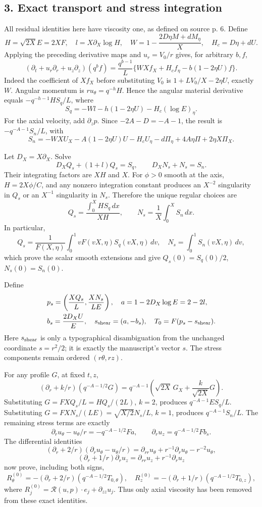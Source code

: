 \documentclass[10pt,a4paper]{article}
\begin{document}
\subsection{3. Exact transport and stress integration}

All residual identities here have viscosity one, as defined on source p. 6. Define
\[
H=\sqrt{2X}E=2XF,\quad l=X\partial_X\log H,
\quad W=1-\frac{2D\eta M+dM_\eta}{X},\quad H_c=D\eta+dU.
\]
Applying the preceding derivative maps and \(u_r=V_0/r\) gives, for arbitrary \(b,f\),
\[
(\partial_t+u_r\partial_r+u_z\partial_z)(q^bf)
=\frac{q^{b-1}}L\{W Xf_X+H_cf_\eta-b(1-2\eta U)f\}.
\]
Indeed the coefficient of \(Xf_X\) before substituting \(V_0\) is \(1+LV_0/X-2\eta U\), exactly \(W\). Angular momentum is \(ru_\theta=q^{-h}H\). Hence the angular material derivative equals \(-q^{-h-1}HS_q/L\), where
\[
S_q=-Wl-h(1-2\eta U)-H_c(\log E)_\eta.
\]
For the axial velocity, add \(\partial_zp\). Since \(-2A-D=-A-1\), the result is \(-q^{-A-1}S_n/L\), with
\[
S_n=-WXU_X-A(1-2\eta U)U-H_cU_\eta
-d\Pi_\eta+4A\eta\Pi+2\eta X\Pi_X.
\]

Let \(D_X=X\partial_X\). Solve
\[
D_XQ_s+(1+l)Q_s=S_q,\qquad D_XN_s+N_s=S_n.
\]
Their integrating factors are \(XH\) and \(X\). For \(\phi>0\) smooth at the axis, \(H=2X\phi/C\), and any nonzero integration constant produces an \(X^{-2}\) singularity in \(Q_s\) or an \(X^{-1}\) singularity in \(N_s\). Therefore the unique regular choices are
\[
Q_s=\frac{\int_0^XHS_q\,dx}{XH},\qquad
N_s=\frac1X\int_0^XS_n\,dx.
\]
In particular,
\[
Q_s=\frac1{F(X,\eta)}\int_0^1vF(vX,\eta)S_q(vX,\eta)\,dv,
\quad N_s=\int_0^1S_n(vX,\eta)\,dv,
\]
which prove the scalar smooth extensions and give \(Q_s(0)=S_q(0)/2\), \(N_s(0)=S_n(0)\).

Define
\[
\begin{aligned}
&p_s=\left(\frac{XQ_s}L,\frac{XN_s}{LE}\right),\quad a=1-2D_X\log E=2-2l,\\
&b_s=\frac{2D_XU}{E},\quad s_{\rm shear}=(a,-b_s),\quad T_0=F(p_s-s_{\rm shear}).
\end{aligned}
\]
Here \(s_{\rm shear}\) is only a typographical disambiguation from the unchanged coordinate \(s=r^2/2\); it is exactly the manuscript's vector \(s\). The stress components remain ordered \((r\theta,rz)\).

For any profile \(G\), at fixed \(t,z\),
\[
(\partial_r+k/r)(q^{-A-1/2}G)
=q^{-A-1}\left(\sqrt{2X}\,G_X+\frac k{\sqrt{2X}}G\right).
\]
Substituting \(G=FXQ_s/L=HQ_s/(2L)\), \(k=2\), produces \(q^{-A-1}ES_q/L\). Substituting \(G=FXN_s/(LE)=\sqrt{X/2}N_s/L\), \(k=1\), produces \(q^{-A-1}S_n/L\). The remaining stress terms are exactly
\[
\partial_ru_\theta-u_\theta/r=-q^{-A-1/2}Fa,
\qquad \partial_ru_z=q^{-A-1/2}Fb_s.
\]
The differential identities
\[
(\partial_r+2/r)(\partial_ru_\theta-u_\theta/r)
=\partial_{rr}u_\theta+r^{-1}\partial_ru_\theta-r^{-2}u_\theta,
\]
\[
(\partial_r+1/r)\partial_ru_z=\partial_{rr}u_z+r^{-1}\partial_ru_z
\]
now prove, including both signs,
\[
R^{(0)}_\theta=-(\partial_r+2/r)(q^{-A-1/2}T_{0,\theta}),
\quad R^{(0)}_z=-(\partial_r+1/r)(q^{-A-1/2}T_{0,z}),
\]
where \(R^{(0)}_j=\mathcal R(u,p)\cdot e_j+\partial_{zz}u_j\). Thus only axial viscosity has been removed from these exact identities.
\end{document}
